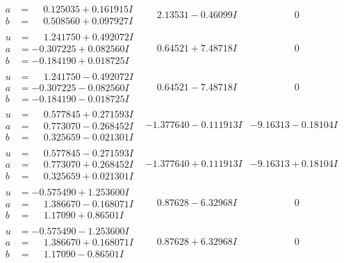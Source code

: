 \documentclass[1p]{elsarticle_modified}
\theoremstyle{definition}
\begin{document}
$$\begin{array}{c|c|c}
\begin{aligned}
a &= \phantom{-}0.125035 + 0.161915 I \\
b &= \phantom{-}0.508560 + 0.097927 I\end{aligned}
 & \phantom{-}2.13531 - 0.46099 I & \phantom{-0.000000 } 0 \\ \hline\begin{aligned}
u &= \phantom{-}1.241750 + 0.492072 I \\
a &= -0.307225 + 0.082560 I \\
b &= -0.184190 + 0.018725 I\end{aligned}
 & \phantom{-}0.64521 + 7.48718 I & \phantom{-0.000000 } 0 \\ \hline\begin{aligned}
u &= \phantom{-}1.241750 - 0.492072 I \\
a &= -0.307225 - 0.082560 I \\
b &= -0.184190 - 0.018725 I\end{aligned}
 & \phantom{-}0.64521 - 7.48718 I & \phantom{-0.000000 } 0 \\ \hline\begin{aligned}
u &= \phantom{-}0.577845 + 0.271593 I \\
a &= \phantom{-}0.773070 - 0.268452 I \\
b &= \phantom{-}0.325659 - 0.021301 I\end{aligned}
 & -1.377640 - 0.111913 I & -9.16313 - 0.18104 I \\ \hline\begin{aligned}
u &= \phantom{-}0.577845 - 0.271593 I \\
a &= \phantom{-}0.773070 + 0.268452 I \\
b &= \phantom{-}0.325659 + 0.021301 I\end{aligned}
 & -1.377640 + 0.111913 I & -9.16313 + 0.18104 I \\ \hline\begin{aligned}
u &= -0.575490 + 1.253600 I \\
a &= \phantom{-}1.386670 - 0.168071 I \\
b &= \phantom{-}1.17090 + 0.86501 I\end{aligned}
 & \phantom{-}0.87628 - 6.32968 I & \phantom{-0.000000 } 0 \\ \hline\begin{aligned}
u &= -0.575490 - 1.253600 I \\
a &= \phantom{-}1.386670 + 0.168071 I \\
b &= \phantom{-}1.17090 - 0.86501 I\end{aligned}
 & \phantom{-}0.87628 + 6.32968 I & \phantom{-0.000000 } 0 \\ \hline\begin{aligned}

\end{aligned}
\end{array}$$
\end{document}
